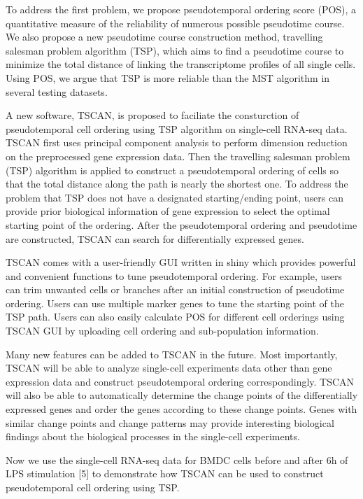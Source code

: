 \documentclass[10pt,oneside]{article}\usepackage[]{graphicx}\usepackage[]{color}
\begin{document}
To address the first problem, we propose pseudotemporal ordering score (POS), a quantitative measure of the reliability of numerous possible pseudotime course. We also propose a new pseudotime course construction method, travelling salesman problem algorithm (TSP), which aims to find a pseudotime course to minimize the total distance of linking the transcriptome profiles of all single cells. Using POS, we argue that TSP is more reliable than the MST algorithm in several testing datasets.

A new software, TSCAN, is proposed to faciliate the consturction of pseudotemporal cell ordering using TSP algorithm on single-cell RNA-seq data. TSCAN first uses principal component analysis to perform dimension reduction on the preprocessed gene expression data. Then the travelling salesman problem (TSP) algorithm is applied to construct a pseudotemporal ordering of cells so that the total distance along the path is nearly the shortest one. To address the problem that TSP does not have a designated starting/ending point, users can provide prior biological information of gene expression to select the optimal starting point of the ordering. After the pseudotemporal ordering and pseudotime are constructed, TSCAN can search for differentially expressed genes.

TSCAN comes with a user-friendly GUI written in shiny which provides powerful and convenient functions to tune pseudotemporal ordering. For example, users can trim unwanted cells or branches after an initial construction of pseudotime ordering. Users can use multiple marker genes to tune the starting point of the TSP path. Users can also easily calculate POS for different cell orderings using TSCAN GUI by uploading cell ordering and sub-population information.

Many new features can be added to TSCAN in the future. Most importantly, TSCAN will be able to analyze single-cell experiments data other than gene expression data and construct pseudotemporal ordering correspondingly. TSCAN will also be able to automatically determine the change points of the differentially expressed genes and order the genes according to these change points. Genes with similar change points and change patterns may provide interesting biological findings about the biological processes in the single-cell experiments.

Now we use the single-cell RNA-seq data for BMDC cells before and after 6h of LPS stimulation [5] to demonstrate how TSCAN can be used to construct pseudotemporal cell ordering using TSP.
\end{document}
